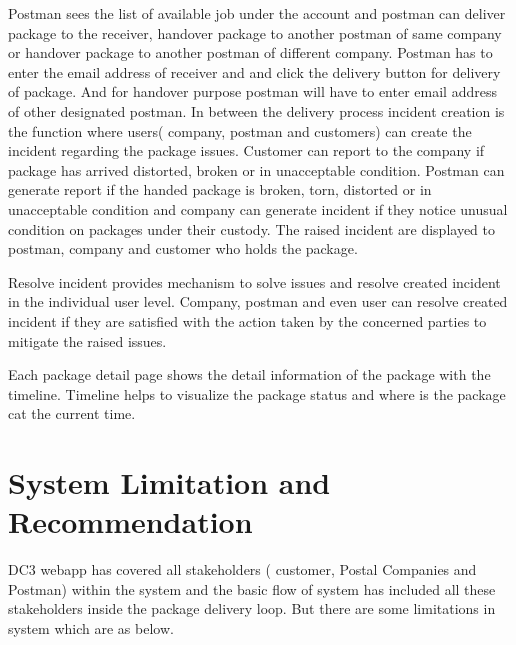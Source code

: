 Postman sees the list of available job under the account  and postman can deliver package to the receiver, handover package to another postman of same company or handover package to another postman of different company. Postman has to enter the email address of receiver and and click the delivery button for delivery of package. And for handover purpose postman will have to enter email address of other designated postman.
In between the delivery process incident creation is the function where users( company, postman and customers) can create the incident regarding the package issues. Customer can report to the company if package has arrived distorted, broken or in unacceptable condition. Postman can generate report if the handed package is broken, torn, distorted or in unacceptable condition and company can generate incident if they notice unusual condition on packages under their custody. The raised incident are displayed to postman, company and customer who holds the package.

Resolve incident provides mechanism to solve issues and resolve created incident in the individual user level. Company, postman and even user can resolve created incident if they are satisfied with the action taken by the concerned parties to mitigate the raised issues.

Each package detail page shows the detail information of the package with the timeline. Timeline helps to visualize the package status and where is the package cat the current time.

\section{System Limitation and Recommendation}
DC3  webapp has covered all stakeholders ( customer, Postal Companies and Postman) within the system and the basic flow of system has included all these stakeholders inside the package delivery loop. But there are some limitations in system which are as below.

